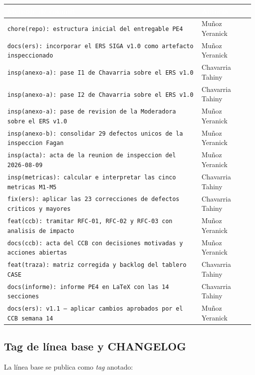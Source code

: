 \documentclass[11pt,letterpaper]{article}
\newcommand{\thead}[1]{\cellcolor{uteqverde}\textcolor{white}{\textbf{#1}}}
\begin{document}
\begin{center}
\small
\begin{tabular}{|p{9.6cm}|p{5.0cm}|}
\hline
\thead{Mensaje de commit} & \thead{Autoría} \\ \hline
\texttt{chore(repo): estructura inicial del entregable PE4} & Muñoz Yeranick \\ \hline
\texttt{docs(ers): incorporar el ERS SIGA v1.0 como artefacto inspeccionado} & Muñoz Yeranick \\ \hline
\texttt{insp(anexo-a): pase I1 de Chavarria sobre el ERS v1.0} & Chavarria Tahiny \\ \hline
\texttt{insp(anexo-a): pase I2 de Chavarria sobre el ERS v1.0} & Chavarria Tahiny \\ \hline
\texttt{insp(anexo-a): pase de revision de la Moderadora sobre el ERS v1.0} & Muñoz Yeranick \\ \hline
\texttt{insp(anexo-b): consolidar 29 defectos unicos de la inspeccion Fagan} & Muñoz Yeranick \\ \hline
\texttt{insp(acta): acta de la reunion de inspeccion del 2026-08-09} & Muñoz Yeranick \\ \hline
\texttt{insp(metricas): calcular e interpretar las cinco metricas M1-M5} & Chavarria Tahiny \\ \hline
\texttt{fix(ers): aplicar las 23 correcciones de defectos criticos y mayores} & Chavarria Tahiny \\ \hline
\texttt{feat(ccb): tramitar RFC-01, RFC-02 y RFC-03 con analisis de impacto} & Muñoz Yeranick \\ \hline
\texttt{docs(ccb): acta del CCB con decisiones motivadas y acciones abiertas} & Muñoz Yeranick \\ \hline
\texttt{feat(traza): matriz corregida y backlog del tablero CASE} & Chavarria Tahiny \\ \hline
\texttt{docs(informe): informe PE4 en LaTeX con las 14 secciones} & Chavarria Tahiny \\ \hline
\texttt{docs(ers): v1.1 --- aplicar cambios aprobados por el CCB semana 14} & Muñoz Yeranick \\ \hline
\end{tabular}
\end{center}

\subsection{Tag de línea base y CHANGELOG}
La línea base se publica como \emph{tag} anotado:
\end{document}
